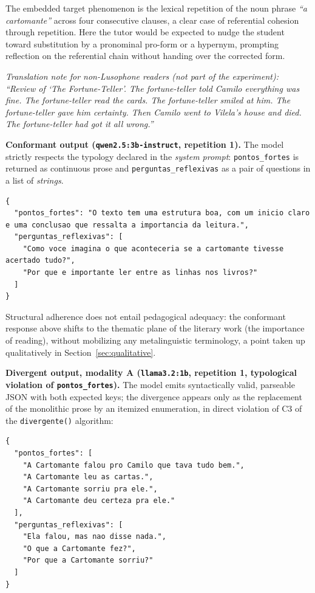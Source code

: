 \documentclass{sbc2023}%
\begin{document}
The embedded target phenomenon is the lexical repetition of the noun phrase \textit{``a cartomante''} across four consecutive clauses, a clear case of referential cohesion through repetition. Here the tutor would be expected to nudge the student toward substitution by a pronominal pro-form or a hypernym, prompting reflection on the referential chain without handing over the corrected form.

\textit{Translation note for non-Lusophone readers (not part of the experiment): ``Review of `The Fortune-Teller'. The fortune-teller told Camilo everything was fine. The fortune-teller read the cards. The fortune-teller smiled at him. The fortune-teller gave him certainty. Then Camilo went to Vilela's house and died. The fortune-teller had got it all wrong.''}

\textbf{Conformant output (\texttt{qwen2.5:3b-instruct}, repetition 1).} The model strictly respects the typology declared in the \textit{system prompt}: \texttt{pontos\_fortes} is returned as continuous prose and \texttt{perguntas\_reflexivas} as a pair of questions in a list of \textit{strings}.

\begin{lstlisting}
{
  "pontos_fortes": "O texto tem uma estrutura boa, com um inicio claro e uma conclusao que ressalta a importancia da leitura.",
  "perguntas_reflexivas": [
    "Como voce imagina o que aconteceria se a cartomante tivesse acertado tudo?",
    "Por que e importante ler entre as linhas nos livros?"
  ]
}
\end{lstlisting}

Structural adherence does not entail pedagogical adequacy: the conformant response above shifts to the thematic plane of the literary work (the importance of reading), without mobilizing any metalinguistic terminology, a point taken up qualitatively in Section~\ref{sec:qualitative}.

\textbf{Divergent output, modality A (\texttt{llama3.2:1b}, repetition 1, typological violation of \texttt{pontos\_fortes}).} The model emits syntactically valid, parseable JSON with both expected keys; the divergence appears only as the replacement of the monolithic prose by an itemized enumeration, in direct violation of C3 of the \texttt{divergente()} algorithm:

\begin{lstlisting}
{
  "pontos_fortes": [
    "A Cartomante falou pro Camilo que tava tudo bem.",
    "A Cartomante leu as cartas.",
    "A Cartomante sorriu pra ele.",
    "A Cartomante deu certeza pra ele."
  ],
  "perguntas_reflexivas": [
    "Ela falou, mas nao disse nada.",
    "O que a Cartomante fez?",
    "Por que a Cartomante sorriu?"
  ]
}
\end{lstlisting}
\end{document}
